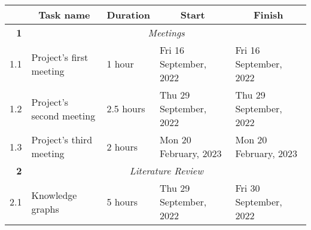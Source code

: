 \documentclass{standalone}
\begin{document}
\begin{tabular}{|r|llll|}
    \hline
    \rowcolor[HTML]{C0C0C0}
    \multicolumn{1}{|c|}{\cellcolor[HTML]{C0C0C0}\textbf{ID}}     & \multicolumn{1}{c|}{\cellcolor[HTML]{C0C0C0}\textbf{Task name}} & \multicolumn{1}{c|}{\cellcolor[HTML]{C0C0C0}\textbf{Duration}} & \multicolumn{1}{c|}{\cellcolor[HTML]{C0C0C0}\textbf{Start}} & \multicolumn{1}{c|}{\cellcolor[HTML]{C0C0C0}\textbf{Finish}} \\ \hline
    \textbf{1}                                                    & \multicolumn{4}{c|}{\textit{Meetings}}                                                                                                                                                                                                                        \\ \hline
    1.1                                                           & \multicolumn{1}{l|}{Project's first meeting}                    & \multicolumn{1}{l|}{1 hour}                                    & \multicolumn{1}{l|}{Fri 16 September, 2022}                 & Fri 16 September, 2022                                       \\ \hline
    1.2                                                           & \multicolumn{1}{l|}{Project's second meeting}                   & \multicolumn{1}{l|}{2.5 hours}                                 & \multicolumn{1}{l|}{Thu 29 September, 2022}                 & Thu 29 September, 2022                                       \\ \hline
    1.3                                                           & \multicolumn{1}{l|}{Project's third meeting}                    & \multicolumn{1}{l|}{2 hours}                                   & \multicolumn{1}{l|}{Mon 20 February, 2023}                  & Mon 20 February, 2023                                        \\ \hline
    \textbf{2}                                                    & \multicolumn{4}{c|}{\textit{Literature Review}}                                                                                                                                                                                                               \\ \hline
    2.1                                                           & \multicolumn{1}{l|}{Knowledge graphs}                           & \multicolumn{1}{l|}{5 hours}                                   & \multicolumn{1}{l|}{Thu 29 September, 2022}                 & Fri 30 September, 2022                                       \\ \hline

\end{tabular}
\end{document}
